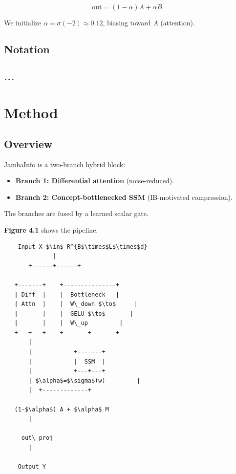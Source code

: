 \[
\text{out} = (1 - \alpha) A + \alpha B
\tag{3.6}
\]

We initialize $\alpha = \sigma(-2) \approx 0.12$, biasing toward $A$ 
(attention).

\subsection{Notation}

\begin{lstlisting}

---
\end{lstlisting}

\section{Method}

\subsection{Overview}

JambaInfo is a two-branch hybrid block:

\begin{itemize}
\item \textbf{Branch 1: Differential attention} (noise-reduced).
\item \textbf{Branch 2: Concept-bottlenecked SSM} (IB-motivated compression).

\end{itemize}
The branches are fused by a learned scalar gate.

\textbf{Figure 4.1} shows the pipeline.

\begin{lstlisting}
    Input X $\in$ R^{B$\times$L$\times$d}
              |
       +------+------+
                      
   +-------+    +---------------+
   | Diff  |    |  Bottleneck   |
   | Attn  |    |  W\_down $\to$     |
   |       |    |  GELU $\to$       |
   |       |    |  W\_up         |
   +---+---+    +-------+-------+
       |                 
       |            +-------+
       |            |  SSM  |
       |            +---+---+
       | $\alpha$=$\sigma$(w)         |
       |  +-------------+
           
   (1-$\alpha$) A + $\alpha$ M
       |
        
     out\_proj
       |
        
    Output Y
\end{lstlisting}

